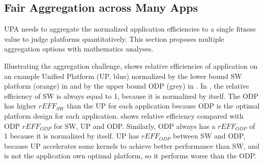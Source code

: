 \vspace{-2pt}
\subsection{Fair Aggregation across Many Apps}
\label{subsec:aggregation}

UPA needs to aggregate the normalized application efficiencies to a single fitness value to judge platforms quantitatively. This section proposes multiple aggregation options with mathematics analyses.

Illustrating the aggregation challenge,  shows relative efficiencies of application on an example Unified Platform (UP, blue) normalized by the lower bound SW platform (orange) in  and by the upper bound ODP (grey) in . In , the relative efficiency of SW is always equal to 1, because it is normalized by itself. The ODP has higher $rEFF_{SW}$ than the UP for each application because ODP is the optimal platform design for each application.  shows relative efficiency compared with ODP $rEFF_{ODP}$ for SW, UP and ODP. Similarly, ODP always has a $rEFF_{ODP}$ of 1 because it is normalized by itself. UP has $rEFF_{ODP}$ between SW and ODP, because UP accelerates some kernels to achieve better performance than SW, and is not the application own optimal platform, so it performs worse than the ODP.






   









